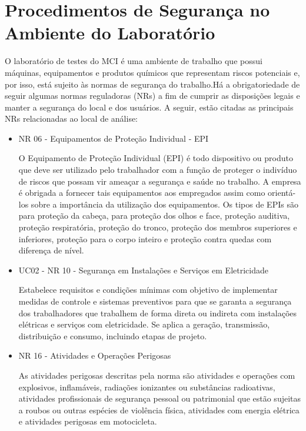 \chapter{Procedimentos de Segurança no Ambiente do Laboratório}

O laboratório de testes do MCI é uma ambiente de trabalho que possui máquinas, equipamentos e produtos químicos que representam riscos potenciais e, por isso, está sujeito às normas de segurança do trabalho.Há a obrigatoriedade de seguir algumas normas reguladoras (NRs) a fim de cumprir as disposições legais e manter a segurança do local e dos usuários. A seguir, estão citadas as principais NRs relacionadas ao local de análise:

\begin{itemize}
	\item NR 06 - Equipamentos de Proteção Individual - EPI

	O Equipamento de Proteção Individual (EPI) é todo dispositivo ou produto que deve ser utilizado pelo trabalhador com a função de proteger o indivíduo de riscos que possam vir ameaçar a segurança e saúde no trabalho. A empresa é obrigada a fornecer tais equipamentos aos empregados assim como orientá-los sobre a importância da utilização dos equipamentos. Os tipos de EPIs são para proteção da cabeça, para proteção dos olhos e face, proteção auditiva, proteção respiratória, proteção do tronco, proteção dos membros superiores e inferiores, proteção para o corpo inteiro e proteção contra quedas com diferença de nível.

	\item UC02 - NR 10 - Segurança em Instalações e Serviços em Eletricidade

	Estabelece requisitos e condições mínimas com objetivo de implementar medidas de controle e sistemas preventivos para que se garanta a segurança dos trabalhadores que trabalhem de forma direta ou indireta com instalações elétricas e serviços com eletricidade.  Se aplica a geração, transmissão, distribuição e consumo, incluindo etapas de projeto.

	\item NR 16 - Atividades e Operações Perigosas

	As atividades perigosas descritas pela norma são atividades e operações com explosivos, inflamáveis, radiações ionizantes ou substâncias radioativas, atividades profissionais de segurança pessoal ou patrimonial que estão sujeitas a roubos ou outras espécies de violência física, atividades com energia elétrica e atividades perigosas em motocicleta.


\end{itemize}

